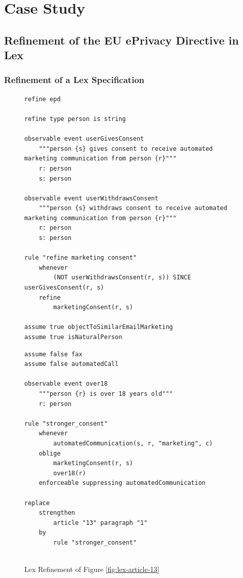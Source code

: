\chapter{Case Study}
\label{chapter:case-study}

\section{Refinement of the EU ePrivacy Directive in Lex}
\label{section:lex-pretix-refinement}


\subsection{Refinement of a Lex Specification}
\begin{figure}
\begin{minipage}{0.6\textwidth}
\begin{lstlisting}
refine epd

refine type person is string

observable event userGivesConsent
    """person {s} gives consent to receive automated marketing communication from person {r}"""
    r: person
    s: person

observable event userWithdrawsConsent
    """person {s} withdraws consent to receive automated marketing communication from person {r}"""
    r: person
    s: person

rule "refine marketing consent"
    whenever
        (NOT userWithdrawsConsent(r, s)) SINCE userGivesConsent(r, s)
    refine
        marketingConsent(r, s)

assume true objectToSimilarEmailMarketing
assume true isNaturalPerson
\end{lstlisting}
\end{minipage}
\hspace{10pt}
\begin{minipage}{0.6\textwidth}
\begin{lstlisting}[firstnumber=23]
assume false fax
assume false automatedCall

observable event over18
    """person {r} is over 18 years old"""
    r: person

rule "stronger_consent"
    whenever
        automatedCommunication(s, r, "marketing", c)
    oblige
        marketingConsent(r, s)
        over18(r)
    enforceable suppressing automatedCommunication

replace
    strengthen
        article "13" paragraph "1"
    by
        rule "stronger_consent"


\end{lstlisting}
\end{minipage}
\caption{Lex Refinement of Figure
\ref{fig:lex-article-13} \label{fig:rex-article-13}}
\end{figure}

